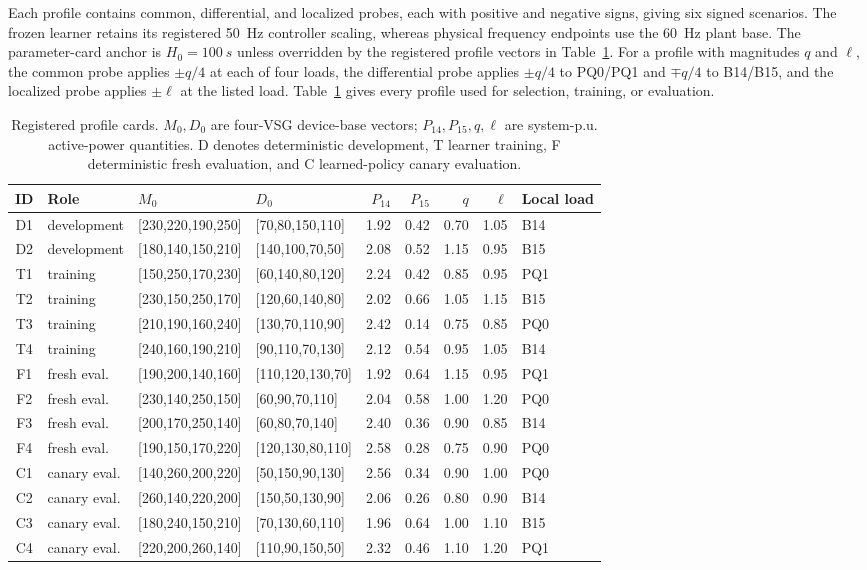 \documentclass[conference,a4paper]{IEEEtran}
\begin{document}
Each profile contains common, differential, and localized probes, each with
positive and negative signs, giving six signed scenarios. The frozen learner
retains its registered \SI{50}{Hz} controller scaling, whereas physical
frequency endpoints use the \SI{60}{Hz} plant base. The parameter-card anchor
is $H_0=\SI{100}{s}$ unless overridden by the registered profile vectors in
Table~\ref{tab:profiles}. For a profile with magnitudes $q$ and $\ell$, the common
probe applies $\pm q/4$ at each of four loads, the differential probe applies
$\pm q/4$ to PQ0/PQ1 and $\mp q/4$ to B14/B15, and the localized probe applies
$\pm\ell$ at the listed load. Table~\ref{tab:profiles} gives every profile used
for selection, training, or evaluation.

\begin{table}[t]
\caption{Registered profile cards. $M_0,D_0$ are four-VSG device-base vectors;
$P_{14},P_{15},q,\ell$ are system-p.u. active-power quantities. D denotes
deterministic development, T learner training, F deterministic fresh evaluation,
and C learned-policy canary evaluation.}
\label{tab:profiles}
\centering
\scriptsize
\setlength{\tabcolsep}{3.0pt}
\begin{tabular}{@{}clllrrrrl@{}}
\toprule
ID & Role & $M_0$ & $D_0$ & $P_{14}$ & $P_{15}$ & $q$ & $\ell$ & Local load\\
\midrule
D1 & development & [230,220,190,250] & [70,80,150,110]  & 1.92 & 0.42 & 0.70 & 1.05 & B14\\
D2 & development & [180,140,150,210] & [140,100,70,50]  & 2.08 & 0.52 & 1.15 & 0.95 & B15\\
T1 & training & [150,250,170,230] & [60,140,80,120] & 2.24 & 0.42 & 0.85 & 0.95 & PQ1\\
T2 & training & [230,150,250,170] & [120,60,140,80] & 2.02 & 0.66 & 1.05 & 1.15 & B15\\
T3 & training & [210,190,160,240] & [130,70,110,90] & 2.42 & 0.14 & 0.75 & 0.85 & PQ0\\
T4 & training & [240,160,190,210] & [90,110,70,130] & 2.12 & 0.54 & 0.95 & 1.05 & B14\\
F1 & fresh eval. & [190,200,140,160] & [110,120,130,70] & 1.92 & 0.64 & 1.15 & 0.95 & PQ1\\
F2 & fresh eval. & [230,140,250,150] & [60,90,70,110]   & 2.04 & 0.58 & 1.00 & 1.20 & PQ0\\
F3 & fresh eval. & [200,170,250,140] & [60,80,70,140]   & 2.40 & 0.36 & 0.90 & 0.85 & B14\\
F4 & fresh eval. & [190,150,170,220] & [120,130,80,110] & 2.58 & 0.28 & 0.75 & 0.90 & PQ0\\
C1 & canary eval. & [140,260,200,220] & [50,150,90,130] & 2.56 & 0.34 & 0.90 & 1.00 & PQ0\\
C2 & canary eval. & [260,140,220,200] & [150,50,130,90] & 2.06 & 0.26 & 0.80 & 0.90 & B14\\
C3 & canary eval. & [180,240,150,210] & [70,130,60,110] & 1.96 & 0.64 & 1.00 & 1.10 & B15\\
C4 & canary eval. & [220,200,260,140] & [110,90,150,50] & 2.32 & 0.46 & 1.10 & 1.20 & PQ1\\
\bottomrule
\end{tabular}
\end{table}
\end{document}
